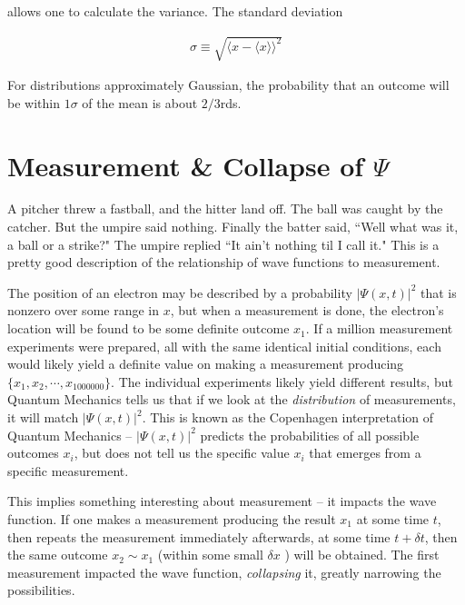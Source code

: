 allows one to calculate the variance. The standard deviation 

\begin{align*}
  \sigma \equiv \sqrt{\langle x - \langle x \rangle  \rangle ^2}
\end{align*}

For distributions approximately Gaussian, the probability that an outcome will
be within $1\sigma$ of the mean is about $2/3$rds. 

\section{Measurement \& Collapse of $\Psi$}

A pitcher threw a fastball, and the hitter land off. The ball was caught by
the catcher. But the umpire said nothing. Finally the batter said, ``Well what
was it, a ball or a strike?" The umpire replied ``It ain't nothing til I call
it." This is a pretty good description of the relationship of wave functions to
measurement. 

The position of an electron may be described by a probability $|\Psi(x, t)|^2$
that is nonzero over some range in $x$, but when a measurement is done, the
electron's location will be found to be some definite outcome $x_1$. If
a million measurement experiments were prepared, all with the same identical initial
conditions, each would likely yield a definite value on making a measurement
producing $\{x_1, x_2, \cdots, x_{1000000}\}$. The individual experiments
likely yield different results, but Quantum Mechanics tells us that if we look
at the \textit{distribution} of measurements, it will match $|\Psi(x, t)|^2$.
This is known as the Copenhagen interpretation of Quantum Mechanics --
$|\Psi(x, t)|^2$ predicts the probabilities of all possible outcomes $x_i$, but
does not tell us the specific value $x_i$ that emerges from a specific
measurement.

This implies something interesting about measurement -- it impacts the wave
function. If one makes a measurement producing the result $x_1$ at some time
$t$, then repeats the measurement immediately afterwards, at some time
$t+\delta t$, then the same outcome $x_2 \sim x_1$ (within some small $\delta
x$ ) will be obtained. The first measurement impacted the wave function,
\textit{collapsing} it, greatly narrowing the possibilities.\\

